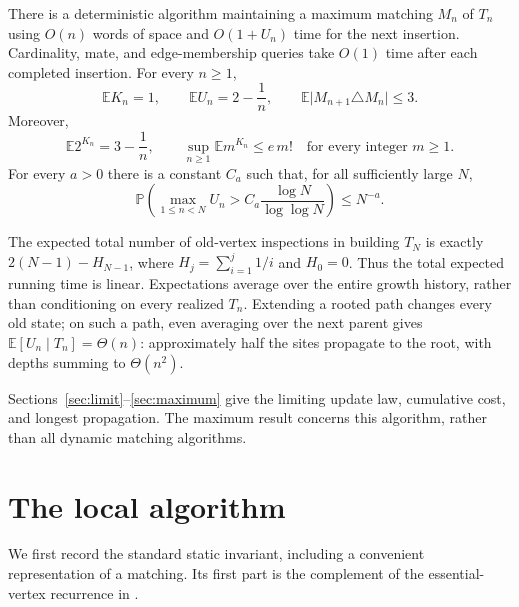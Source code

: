 \documentclass[runningheads,envcountsame,orivec]{llncs}
\newcommand{\E}{\mathbb E}
\newcommand{\PP}{\mathbb P}
\begin{document}
\begin{theorem}\label{thm:main}
There is a deterministic algorithm maintaining a maximum matching $M_n$
of $T_n$ using $O(n)$ words of space and $O(1+U_n)$ time for the next
insertion. Cardinality, mate, and edge-membership queries take $O(1)$ time
after each completed insertion. For every $n\ge1$,
\begin{equation}\label{eq:mainmeans}
 \E K_n=1,\qquad \E U_n=2-\frac1n,
 \qquad \E\lvert M_{n+1}\triangle M_n\rvert\le3.
\end{equation}
Moreover,
\begin{equation}\label{eq:moment2main}
 \E 2^{K_n}=3-\frac1n,
 \qquad \sup_{n\ge1}\E m^{K_n}\le e\,m!
 \quad\text{for every integer }m\ge1.
\end{equation}
For every $a>0$ there is a constant $C_a$ such that, for all sufficiently
large $N$,
\begin{equation}\label{eq:seqbound}
 \PP\left(\max_{1\le n<N}U_n>
 C_a\frac{\log N}{\log\log N}\right)\le N^{-a}.
\end{equation}
\end{theorem}

The expected total number of old-vertex inspections in building $T_N$ is
exactly $2(N-1)-H_{N-1}$, where $H_j=\sum_{i=1}^j1/i$ and $H_0=0$.
Thus the total expected running time is linear. Expectations average
over the entire growth history, rather than conditioning on every
realized $T_n$. Extending a rooted path changes every old state; on
such a path, even averaging over the next parent gives
$\E[U_n\mid T_n]=\Theta(n)$: approximately half the sites propagate
to the root, with depths summing to $\Theta(n^2)$.

Sections~\ref{sec:limit}--\ref{sec:maximum} give the limiting update
law, cumulative cost, and longest propagation. The maximum result
concerns this algorithm, rather than all dynamic matching algorithms.

\section{The local algorithm}\label{sec:algorithm}

We first record the standard static invariant, including a convenient
representation of a matching. Its first part is the complement of the
essential-vertex recurrence in \cite{Janson2020}.
\end{document}
